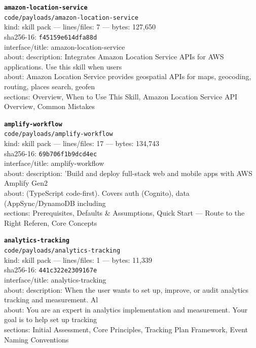 \noindent\textbf{\texttt{amazon-location-service}}\\
\texttt{code/payloads/amazon-location-service}\\
kind: skill pack --- lines/files: 7 --- bytes: 127,650\\
sha256-16: \texttt{f45159e614dfa88d}\\
interface/title: amazon-location-service\\
about: description: Integrates Amazon Location Service APIs for AWS applications. Use this skill when users\\
about: Amazon Location Service provides geospatial APIs for maps, geocoding, routing, places search, geofen\\
sections: Overview, When to Use This Skill, Amazon Location Service API Overview, Common Mistakes\\
\vspace*{6.0pt}
\newpage

\noindent\textbf{\texttt{amplify-workflow}}\\
\texttt{code/payloads/amplify-workflow}\\
kind: skill pack --- lines/files: 17 --- bytes: 134,743\\
sha256-16: \texttt{69b706f1b9dcd4ec}\\
interface/title: amplify-workflow\\
about: description: 'Build and deploy full-stack web and mobile apps with AWS Amplify Gen2\\
about: (TypeScript code-first). Covers auth (Cognito), data (AppSync/DynamoDB including\\
sections: Prerequisites, Defaults \& Assumptions, Quick Start — Route to the Right Referen, Core Concepts\\
\vspace*{6.0pt}

\noindent\textbf{\texttt{analytics-tracking}}\\
\texttt{code/payloads/analytics-tracking}\\
kind: skill pack --- lines/files: 1 --- bytes: 11,339\\
sha256-16: \texttt{441c322e2309167e}\\
interface/title: analytics-tracking\\
about: description: When the user wants to set up, improve, or audit analytics tracking and measurement. Al\\
about: You are an expert in analytics implementation and measurement. Your goal is to help set up tracking \\
sections: Initial Assessment, Core Principles, Tracking Plan Framework, Event Naming Conventions\\
\vspace*{6.0pt}


